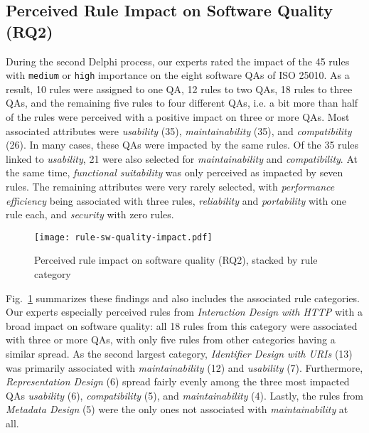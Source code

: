\documentclass[runningheads]{llncs}
\begin{document}
\subsection{Perceived Rule Impact on Software Quality (RQ2)}
During the second Delphi process, our experts rated the impact of the 45 rules with \texttt{medium} or \texttt{high} importance on the eight software QAs of ISO 25010.
As a result, 10 rules were assigned to one QA, 12 rules to two QAs, 18 rules to three QAs, and the remaining five rules to four different QAs, i.e. a bit more than half of the rules were perceived with a positive impact on three or more QAs.
Most associated attributes were \textit{usability} (35), \textit{maintainability} (35), and \textit{compatibility} (26).
In many cases, these QAs were impacted by the same rules.
Of the 35 rules linked to \textit{usability}, 21 were also selected for \textit{maintainability} and \textit{compatibility}.
At the same time, \textit{functional suitability} was only perceived as impacted by seven rules.
The remaining attributes were very rarely selected, with \textit{performance efficiency} being associated with three rules, \textit{reliability} and \textit{portability} with one rule each, and \textit{security} with zero rules.

\begin{figure}
    \centering
    \texttt{[image: rule-sw-quality-impact.pdf]}
    \caption{Perceived rule impact on software quality (RQ2), stacked by rule category}
    \label{fig:quality-impact}
\end{figure}

Fig.~\ref{fig:quality-impact} summarizes these findings and also includes the associated rule categories.
Our experts especially perceived rules from \textit{Interaction Design with HTTP} with a broad impact on software quality: all 18 rules from this category were associated with three or more QAs, with only five rules from other categories having a similar spread.
As the second largest category, \textit{Identifier Design with URIs} (13) was primarily associated with \textit{maintainability} (12) and \textit{usability} (7).
Furthermore, \textit{Representation Design} (6) spread fairly evenly among the three most impacted QAs \textit{usability} (6), \textit{compatibility} (5), and \textit{maintainability} (4).
Lastly, the rules from \textit{Metadata Design} (5) were the only ones not associated with \textit{maintainability} at all.
\end{document}
